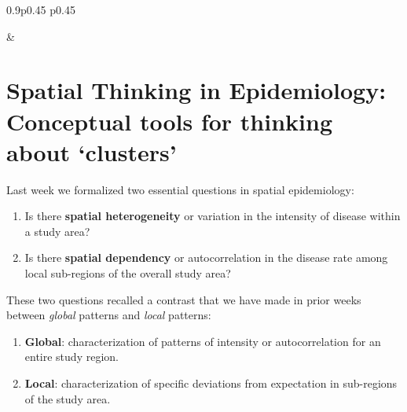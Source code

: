 \documentclass[
]{book}
\providecommand{\tightlist}{%
  \setlength{\itemsep}{0pt}\setlength{\parskip}{0pt}}
\begin{document}
\begin{table}[ht]
\begin{centerbox}
\begin{threeparttable}
\begin{tabularx}{0.9\textwidth}{p{} p{}}

 &
 \tabularnewline[-0.5pt]


\end{tabularx}
\end{threeparttable}\par\end{centerbox}

\end{table}
 

\hypertarget{spatial-thinking-in-epidemiology-conceptual-tools-for-thinking-about-clusters}{%
\section{Spatial Thinking in Epidemiology: Conceptual tools for thinking about `clusters'}\label{spatial-thinking-in-epidemiology-conceptual-tools-for-thinking-about-clusters}}

Last week we formalized two essential questions in spatial epidemiology:

\begin{enumerate}
\def\labelenumi{\arabic{enumi}.}
\tightlist
\item
  Is there \textbf{spatial heterogeneity} or variation in the intensity of disease within a study area?
\item
  Is there \textbf{spatial dependency} or autocorrelation in the disease rate among local sub-regions of the overall study area?
\end{enumerate}

These two questions recalled a contrast that we have made in prior weeks between \emph{global} patterns and \emph{local} patterns:

\begin{enumerate}
\def\labelenumi{\arabic{enumi}.}
\tightlist
\item
  \textbf{Global}: characterization of patterns of intensity or autocorrelation for an entire study region.
\item
  \textbf{Local}: characterization of specific deviations from expectation in sub-regions of the study area.
\end{enumerate}
\end{document}
